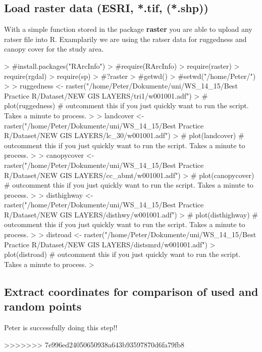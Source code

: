 \documentclass[11pt, a4paper]{article} %
\begin{document}
\subsection{Load raster data (ESRI, *.tif, (*.shp))}%
With a simple function stored in the package \textbf{raster} you are able to upload any ratser file into R. Examplarily we are using the ratser data for ruggedness and canopy cover for the study area.  


\begin{Schunk}
\begin{Sinput}
> #install.packages("RArcInfo")
> #require(RArcInfo)
> require(raster)
> require(rgdal)
> require(sp)
> #?raster
> #getwd()
> #setwd("/home/Peter/")
> 
> ruggedness <- raster("/home/Peter/Dokumente/uni/WS_14_15/Best Practice R/Dataset/NEW GIS LAYERS/tri1/w001001.adf") 
> # plot(ruggedness) # outcomment this if you just quickly want to run the script. Takes a minute to process.
> 
> landcover <- raster("/home/Peter/Dokumente/uni/WS_14_15/Best Practice R/Dataset/NEW GIS LAYERS/lc_30/w001001.adf") 
> # plot(landcover) # outcomment this if you just quickly want to run the script. Takes a minute to process.
> 
> canopycover <- raster("/home/Peter/Dokumente/uni/WS_14_15/Best Practice R/Dataset/NEW GIS LAYERS/cc_abmt/w001001.adf") 
> # plot(canopycover) # outcomment this if you just quickly want to run the script. Takes a minute to process.
> 
> disthighway <- raster("/home/Peter/Dokumente/uni/WS_14_15/Best Practice R/Dataset/NEW GIS LAYERS/disthwy/w001001.adf") 
> # plot(disthighway) # outcomment this if you just quickly want to run the script. Takes a minute to process.
> 
> distroad <- raster("/home/Peter/Dokumente/uni/WS_14_15/Best Practice R/Dataset/NEW GIS LAYERS/distsmrd/w001001.adf") 
> plot(distroad) # outcomment this if you just quickly want to run the script. Takes a minute to process.
> 
\end{Sinput}
\end{Schunk}


\subsection{Extract coordinates for comparison of used and random points} %
Peter is successfully doing this step!!


>>>>>>> 7e996ed24050650938a643b93597870d6fa79fb8
\end{document}
